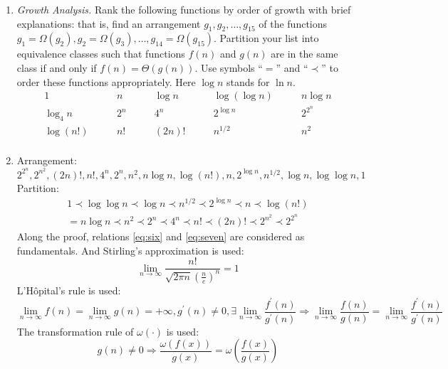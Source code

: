 \documentclass[12pt,a4paper]{article}
\makeatletter
\newtheorem*{solution}{Solution}
\theoremstyle{definition}
\renewenvironment{solution}[1][Solution] {\par\pushQED{\qed}\normalfont\topsep6\p@\@plus6\p@\relax\trivlist\item[\hskip\labelsep\bfseries#1\@addpunct{.}]\ignorespaces}{\popQED\endtrivlist\@endpefalse} \makeatother
\providecommand{\limn}{\lim_{n\rightarrow \infty}}
\makeatother
\begin{document}
\begin{enumerate}
\item \textit{Growth Analysis.} Rank the following functions by order of growth with brief explanations: that is, find an arrangement $g_1, g_2, \ldots , g_{15}$ of the functions $g_1 = \Omega(g_2), g_2 = \Omega(g_3), \ldots, g_{14} = \Omega(g_{15})$.  Partition your list into equivalence classes such that functions $f(n)$ and $g(n)$ are in the same class if and only if $f(n) = \Theta(g(n))$. Use symbols ``$=$'' and ``$\prec$'' to order these functions appropriately. Here $\log n$ stands for $\ln n$.
$$
\begin{array}{ccccc}
	1 \quad & \quad n \quad & \quad \log n \quad & \quad \log (\log n) \quad & \quad n \log n \\
	\log_4 n \quad & \quad 2^n \quad & \quad 4^n \quad & \quad 2^{\log n} \quad & \quad 2^{2^n} \\
	\log (n!) \quad & \quad n! \quad & \quad (2n)! \quad & \quad  n^{1/2} \quad & \quad n^2 \\
\end{array}
$$
\begin{solution}
	Arrangement:
	\begin{equation*}
		2^{2^n},2^{n^2},(2n)!,n!,4^{n},2^n,n^2,n\log n,\log (n!),n,2^{\log n},n^{1/2},\log n,\log \log n,1
	\end{equation*}
	Partition:
	\begin{equation*}
		\begin{aligned}
			1\prec \log\log n\prec \log n\prec n^{1/2}\prec 2^{\log n}\prec n\prec \log (n!)\\= n\log n
			\prec n^2 \prec 2^n \prec 4^{n}\prec n!\prec (2n)!\prec 2^{n^2}\prec 2^{2^n}
		\end{aligned}
	\end{equation*}
	Along the proof, relations \eqref{eq:six} and \eqref{eq:seven} are considered as fundamentals. And Stirling's approximation is used:
	\begin{equation*}
		\limn \frac{n!}{\sqrt{2\pi n}\left(\frac{n}{e}\right)^n} = 1
	\end{equation*}
	L'H\^{o}pital's rule is used: 
	\begin{equation*}
		\limn f(n) = \limn g(n)=+\infty,g^\prime (n)\neq 0,\exists \limn \frac{f^\prime (n)}{g^\prime (n)}\Rightarrow\limn \frac{f(n)}{g(n)} = \limn \frac{f^\prime (n)}{g^\prime (n)}
	\end{equation*}
	The transformation rule of $\omega(\cdot)$ is used:
	\begin{equation*}
		g(n)\neq 0 \Rightarrow \frac{\omega(f(x))}{g(x)} = \omega \left(\frac{f(x)}{g(x)}\right)
	\end{equation*}


\end{solution}
\end{enumerate}
\end{document}
